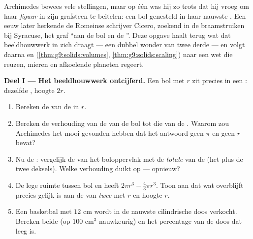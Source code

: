 \begin{problem}
\label{pb:g9:solids:1}
Archimedes bewees vele stellingen, maar op één was hij zo trots dat hij vroeg om
haar \emph{figuur} in zijn grafsteen te beitelen: een bol genesteld in haar nauwste
. Een eeuw later herkende de Romeinse schrijver Cicero, zoekend in de
braamstruiken bij Syracuse, het graf ``aan de bol en de ''. Deze opgave
haalt terug wat dat beeldhouwwerk in zich draagt --- een dubbel wonder van twee
derde --- en
volgt daarna  en  (\cref{thm:g9:solids:volumes},
\cref{thm:g9:solids:scaling}) naar een wet die reuzen, mieren en afkoelende planeten
regeert.

\medskip
\noindent\textbf{Deel I --- Het beeldhouwwerk ontcijferd.}
Een bol met  $r$ zit precies in een : dezelfde , hoogte $2r$.
\begin{enumerate}
  \item Bereken de  van de  in $r$.
  \item Bereken de verhouding van de  van de bol tot die van de .
        Waarom zou Archimedes het mooi gevonden hebben dat het antwoord geen $\pi$
        en geen $r$ bevat?
  \item Nu de : vergelijk de  van het boloppervlak met de
        \emph{totale}  van de  (het  plus de twee
        deksels). Welke verhouding duikt op --- opnieuw?
  \item De lege ruimte tussen bol en  heeft 
        $2\pi r^3 - \frac43\pi r^3$. Toon aan dat wat overblijft precies gelijk is
        aan de  van \emph{twee } met  $r$ en hoogte $r$.
  \item Een basketbal met  $12$ cm wordt in de nauwste cilindrische doos
        verkocht. Bereken beide  (op $100$ cm$^3$ nauwkeurig) en het
        percentage van de doos dat leeg is.
\end{enumerate}


\end{problem}
